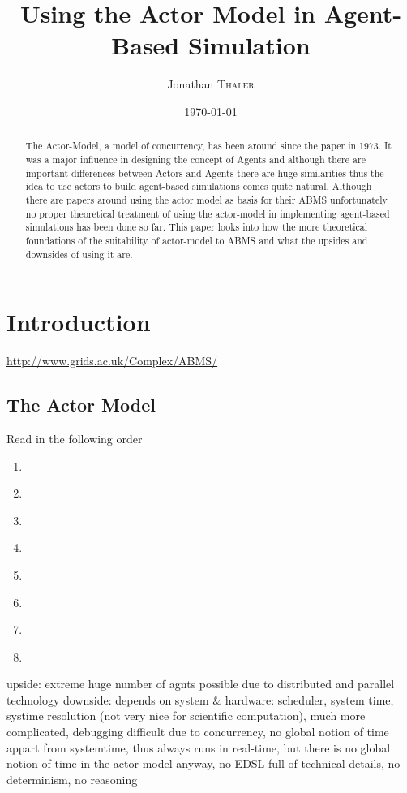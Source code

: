 \documentclass{article}
\title{Using the Actor Model in Agent-Based Simulation} %
\author{Jonathan \textsc{Thaler}}
\date{\today}
\begin{document}
\maketitle 

\begin{abstract}
The Actor-Model, a model of concurrency, has been around since the paper \cite{Hewitt_1973} in 1973. It was a major influence in designing the concept of Agents and although there are important differences between Actors and Agents there are huge similarities thus the idea to use actors to build agent-based simulations comes quite natural. Although there are papers around using the actor model as basis for their ABMS unfortunately no proper theoretical treatment of using the actor-model in implementing agent-based simulations has been done so far. This paper looks into how the more theoretical foundations of the suitability of actor-model to ABMS and what the upsides and downsides of using it are.
\end{abstract}

\section{Introduction}
\url{http://www.grids.ac.uk/Complex/ABMS/}

\subsection{The Actor Model}
Read in the following order


\begin{enumerate}
\item \cite{Hewitt_1973}
\item \cite{Greif_1975}
\item \cite{Clinger_1981}
\item \cite{Agha_1986}
\item \cite{Agha_1997}
\item \cite{Hewitt_2007}
\item \cite{Hewitt_2010}
\item \cite{Agha_2004}
\end{enumerate}

upside: extreme huge number of agnts possible due to distributed and parallel technology 
downside: depends on system \& hardware: scheduler, system time, systime resolution (not very nice for scientific computation), much more complicated, debugging difficult due to concurrency, no global notion of time appart from systemtime, thus always runs in real-time, but there is no global notion of time in the actor model anyway, no EDSL full of technical details, no determinism, no reasoning
\end{document}
